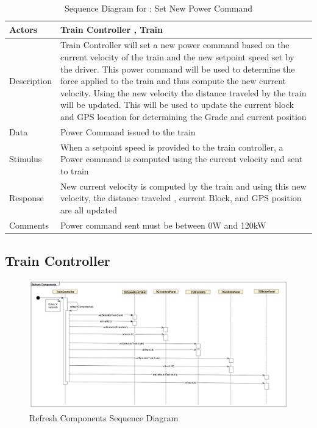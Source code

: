 \documentclass[]{article}
\begin{document}
\begin{table}[H]
	\centering
	\caption{Sequence Diagram for : Set New Power Command}
	\begin{tabular}{|l|l|}
		\hline
		Actors & \parbox[t]{10cm}{Train Controller , Train} \\ \hline
		Description & \parbox[t]{10cm}{Train Controller will set a new power command based on the current velocity of the train and the new setpoint speed set by the driver. This power command will be used to determine the force applied to the train and thus compute the new current velocity. Using the new velocity the distance traveled by the train will be updated. This will be used to update the current block and GPS location for determining the Grade and current position} \\ \hline
		Data &  \parbox[t]{10cm}{Power Command issued to the train} \\ \hline
		Stimulus &  \parbox[t]{10cm}{When a setpoint speed is provided to the train controller, a Power command is computed using the current velocity and sent to train} \\ \hline
		Response & \parbox[t]{10cm}{New current velocity is computed by the train and using this new velocity, the distance traveled , current Block, and GPS position are all updated }\\ \hline
		Comments & \parbox[t]{10cm}{Power command sent must be between 0W and 120kW}  \\ \hline
	\end{tabular}
\end{table}

\subsection{Train Controller}

\begin{figure}[H]
	\centering
	\includegraphics[width=\textwidth]{tc_refreshui_usecase}
	\caption{Refresh Components Sequence Diagram}
\end{figure}
\end{document}
